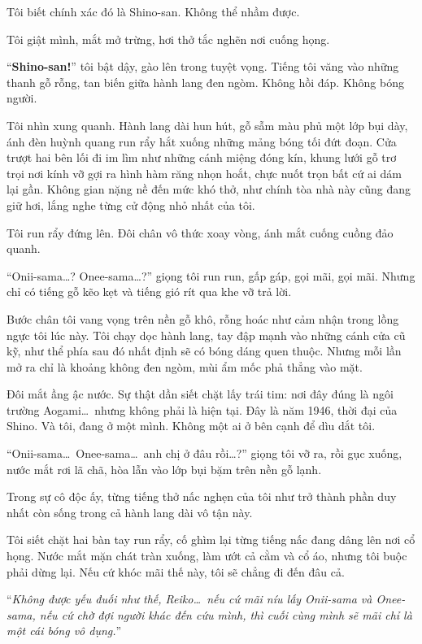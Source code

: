 \documentclass[../main.tex]{subfiles}
\begin{document}
Tôi biết chính xác đó là Shino-san. Không thể nhầm được.

Tôi giật mình, mắt mở trừng, hơi thở tắc nghẽn nơi cuống họng.

``\textbf{Shino-san!}'' tôi bật dậy, gào lên trong tuyệt vọng. Tiếng tôi văng vào những thanh gỗ rỗng, tan biến giữa hành lang đen ngòm. Không hồi đáp. Không bóng người.

Tôi nhìn xung quanh. Hành lang dài hun hút, gỗ sẫm màu phủ một lớp bụi dày, ánh đèn huỳnh quang run rẩy hắt xuống những mảng bóng tối đứt đoạn. Cửa trượt hai bên lối đi im lìm như những cánh miệng đóng kín, khung lưới gỗ trơ trọi nơi kính vỡ gợi ra hình hàm răng nhọn hoắt, chực nuốt trọn bất cứ ai dám lại gần. Không gian nặng nề đến mức khó thở, như chính tòa nhà này cũng đang giữ hơi, lắng nghe từng cử động nhỏ nhất của tôi.

Tôi run rẩy đứng lên. Đôi chân vô thức xoay vòng, ánh mắt cuống cuồng đảo quanh.

``Onii-sama\dots? Onee-sama\dots?''  giọng tôi run run, gấp gáp, gọi mãi, gọi mãi. Nhưng chỉ có tiếng gỗ kẽo kẹt và tiếng gió rít qua khe vỡ trả lời.

Bước chân tôi vang vọng trên nền gỗ khô, rỗng hoác như cảm nhận trong lồng ngực tôi lúc này. Tôi chạy dọc hành lang, tay đập mạnh vào những cánh cửa cũ kỹ, như thể phía sau đó nhất định sẽ có bóng dáng quen thuộc. Nhưng mỗi lần mở ra chỉ là khoảng không đen ngòm, mùi ẩm mốc phả thẳng vào mặt.

Đôi mắt ầng ậc nước. Sự thật dần siết chặt lấy trái tim: nơi đây đúng là ngôi trường Aogami\dots\ nhưng không phải là hiện tại. Đây là năm 1946, thời đại của Shino. Và tôi, đang ở một mình. Không một ai ở bên cạnh để dìu dắt tôi.

``Onii-sama\dots\ Onee-sama\dots\ anh chị ở đâu rồi\dots?'' giọng tôi vỡ ra, rồi gục xuống, nước mắt rơi lã chã, hòa lẫn vào lớp bụi bặm trên nền gỗ lạnh.

Trong sự cô độc ấy, từng tiếng thở nấc nghẹn của tôi như trở thành phần duy nhất còn sống trong cả hành lang dài vô tận này.

Tôi siết chặt hai bàn tay run rẩy, cố ghìm lại từng tiếng nấc đang dâng lên nơi cổ họng. Nước mắt mặn chát tràn xuống, làm ướt cả cằm và cổ áo, nhưng tôi buộc phải dừng lại. Nếu cứ khóc mãi thế này, tôi sẽ chẳng đi đến đâu cả.

``\textit{Không được yếu đuối như thế, Reiko\dots\ nếu cứ mãi níu lấy Onii-sama và Onee-sama, nếu cứ chờ đợi người khác đến cứu mình, thì cuối cùng mình sẽ mãi chỉ là một cái bóng vô dụng.}''
\end{document}
